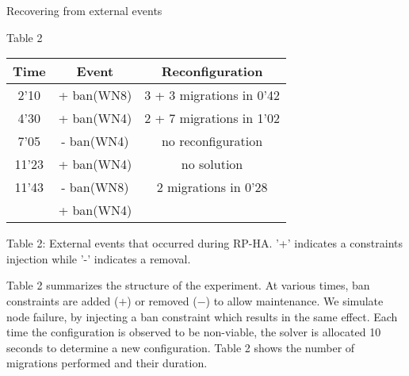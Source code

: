 \begin{frame}{Recovering from external events}

\begin{block}{Table 2}
\begin{center}
\begin{tabular}{|c|c|c|}
\hline
Time   &   Event      &     Reconfiguration \\ \hline\hline
 2'10  & + ban({WN8}) & 3 + 3 migrations in 0'42 \\ \hline
 4'30  & + ban({WN4}) & 2 + 7 migrations in 1'02 \\ \hline
 7'05  & - ban({WN4}) &   no reconfiguration \\ \hline
11'23  & + ban({WN4}) &      no solution \\ \hline
11'43  & - ban({WN8}) &  2 migrations in 0'28 \\ \hline
       & + ban({WN4}) & \\ \hline
\end{tabular}
\end{center}
Table 2: External events that occurred during RP-HA. ’+’ indicates a constraints
injection while ’-’ indicates a removal.
\end{block}


   Table 2 summarizes the structure of the experiment. At various times, ban
constraints are added ($+$) or removed ($−$) to allow maintenance. We simulate
node failure, by injecting a ban constraint which results in the same effect.
Each time the configuration is observed to be non-viable, the solver is allocated
10 seconds to determine a new configuration. Table 2 shows the number of
migrations performed and their duration.

\end{frame}



